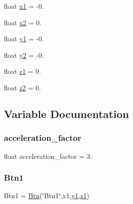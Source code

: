\begin{DoxyCompactItemize}
float \hyperlink{namespaceRET__config_a3389d8b95846602e8f94cc15f41e48e9}{x1} = -\/0.
\item 
float \hyperlink{namespaceRET__config_a24d6ffb6e8780eef0c81cd97e3f4fdaf}{x2} = 0.
\item 
float \hyperlink{namespaceRET__config_a9fe80bf4738047a31d7c162807ed85f0}{y1} = -\/0.
\item 
float \hyperlink{namespaceRET__config_a07bcd014e69eddcf4243b2a961014eaf}{y2} = -\/0.
\item 
float \hyperlink{namespaceRET__config_a7da4886c0a2e03b8bb9ed62eb20efb78}{z1} = 0.
\item 
float \hyperlink{namespaceRET__config_a55196b87940893e540ba636218f4eb07}{z2} = 0.
\end{DoxyCompactItemize}


\subsection{Variable Documentation}
\mbox{\label{namespaceRET__config_a425bc201cf7b10f0c4f1068f752e7c9b}} 
\subsubsection{\texorpdfstring{acceleration\+\_\+factor}{acceleration\_factor}}
{\footnotesize\ttfamily float acceleration\+\_\+factor = 3.}

\mbox{\label{namespaceRET__config_af037c6b9ff0314103d8127acc9d07e0b}} 
\subsubsection{\texorpdfstring{Btn1}{Btn1}}
{\footnotesize\ttfamily Btn1 = \hyperlink{classRET__config_1_1Btn}{Btn}(\char`\"{}Btn1\char`\"{},x1,\hyperlink{namespaceRET__config_a9fe80bf4738047a31d7c162807ed85f0}{y1},\hyperlink{namespaceRET__config_a7da4886c0a2e03b8bb9ed62eb20efb78}{z1})}

\mbox{\label{namespaceRET__config_a118140d2896d1aff1e3c9355f9deb314}} 
